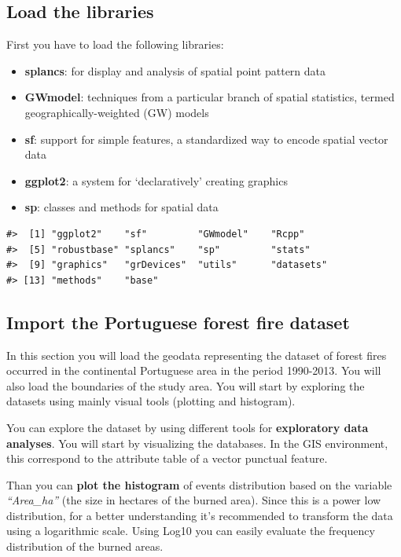 \documentclass[
]{book}
\providecommand{\tightlist}{%
  \setlength{\itemsep}{0pt}\setlength{\parskip}{0pt}}
\theoremstyle{definition}
\theoremstyle{definition}
\theoremstyle{definition}
\theoremstyle{definition}
\theoremstyle{remark}
\begin{document}
\hypertarget{load-the-libraries}{%
\subsection{Load the libraries}\label{load-the-libraries}}

First you have to load the following libraries:

\begin{itemize}
\tightlist
\item
  \textbf{splancs}: for display and analysis of spatial point pattern data
\item
  \textbf{GWmodel}: techniques from a particular branch of spatial statistics, termed geographically-weighted (GW) models
\item
  \textbf{sf}: support for simple features, a standardized way to encode spatial vector data
\item
  \textbf{ggplot2}: a system for `declaratively' creating graphics
\item
  \textbf{sp}: classes and methods for spatial data
\end{itemize}

\begin{verbatim}
#>  [1] "ggplot2"    "sf"         "GWmodel"    "Rcpp"      
#>  [5] "robustbase" "splancs"    "sp"         "stats"     
#>  [9] "graphics"   "grDevices"  "utils"      "datasets"  
#> [13] "methods"    "base"
\end{verbatim}

\hypertarget{import-the-portuguese-forest-fire-dataset}{%
\subsection{Import the Portuguese forest fire dataset}\label{import-the-portuguese-forest-fire-dataset}}

In this section you will load the geodata representing the dataset of forest fires occurred in the continental Portuguese area in the period 1990-2013.
You will also load the boundaries of the study area.
You will start by exploring the datasets using mainly visual tools (plotting and histogram).

You can explore the dataset by using different tools for \textbf{exploratory data analyses}.
You will start by visualizing the databases.
In the GIS environment, this correspond to the attribute table of a vector punctual feature.

Than you can \textbf{plot the histogram} of events distribution based on the variable \emph{``Area\_ha''} (the size in hectares of the burned area).
Since this is a power low distribution, for a better understanding it's recommended to transform the data using a logarithmic scale.
Using Log10 you can easily evaluate the frequency distribution of the burned areas.
\end{document}
